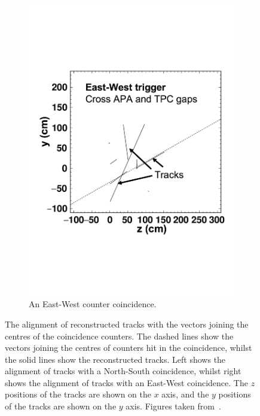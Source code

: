 \begin{figure}
\begin{subfigure}{0.48\textwidth}
    \includegraphics[width=\textwidth]{East-West}
    \caption{An East-West counter coincidence.}
  \end{subfigure}
  \caption[The alignment of reconstructed tracks with the vectors joining the centres of the coincidence counters]
          {The alignment of reconstructed tracks with the vectors joining the centres of the coincidence counters. The dashed lines show the vectors joining the centres of counters hit in the coincidence, whilst the solid lines show the reconstructed tracks. Left shows the alignment of tracks with a North-South coincidence, whilst right shows the alignment of tracks with an East-West coincidence. The $z$ positions of the tracks are shown on the $x$ axis, and the $y$ positions of the tracks are shown on the $y$ axis. Figures taken from~\citep{TingjunClustering}.}
          \label{fig:CounterTrackAngle}
\end{figure}

